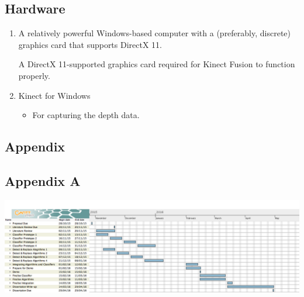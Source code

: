 \documentclass[11pt,openright,a4paper]{report}
\begin{document}
\section{Hardware}
  \begin{enumerate}
    \item A relatively powerful Windows-based computer with a (preferably, discrete) graphics card that supports DirectX 11.
      \begin{itemize}
        A DirectX 11-supported graphics card required for Kinect Fusion to function properly. 
      \end{itemize}
    \item Kinect for Windows
      \begin{itemize}
        \item For capturing the depth data.
      \end{itemize}
  \end{enumerate}

\newpage


\begin{landscape}
\chapter{Appendix}
\section{Appendix A}
\includegraphics[scale=0.38,keepaspectratio]{gant}
\end{landscape}
\newpage
\end{document}

